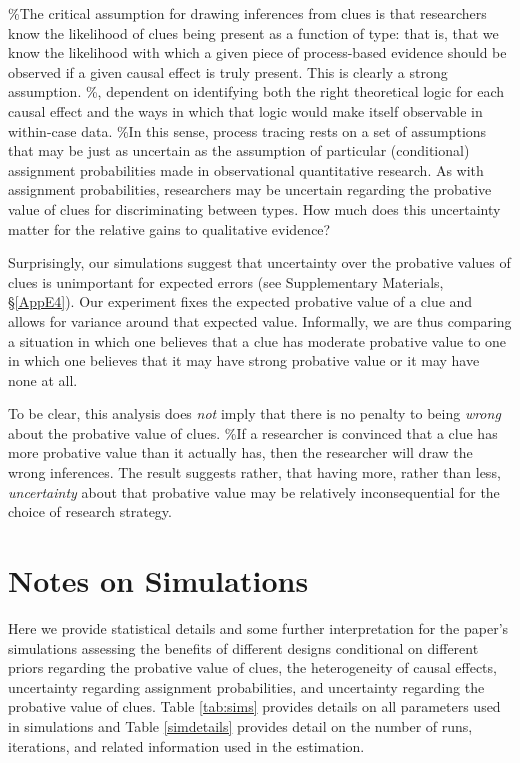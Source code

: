 \documentclass[12pt,]{book}
\begin{document}
\%The critical assumption for drawing inferences from clues is that researchers know the likelihood of clues being present as a function of type: that is, that we know the likelihood with which a given piece of process-based evidence should be observed if a given causal effect is truly present. This is clearly a strong assumption. \%, dependent on identifying both the right theoretical logic for each causal effect and the ways in which that logic would make itself observable in within-case data.
\%In this sense, process tracing rests on a set of assumptions that may be just as uncertain as the assumption of particular (conditional) assignment probabilities made in observational quantitative research.
As with assignment probabilities, researchers may be uncertain regarding the probative value of clues for discriminating between types. How much does this uncertainty matter for the relative gains to qualitative evidence?

Surprisingly, our simulations suggest that uncertainty over the probative values of clues is unimportant for expected errors (see Supplementary Materials, \S\ref{AppE4}). Our experiment fixes the expected probative value of a clue and allows for variance around that expected value. Informally, we are thus comparing a situation in which one believes that a clue has moderate probative value to one in which one believes that it may have strong probative value or it may have none at all.

To be clear, this analysis does \emph{not} imply that there is no penalty to being \emph{wrong} about the probative value of clues. \%If a researcher is convinced that a clue has more probative value than it actually has, then the researcher will draw the wrong inferences.
The result suggests rather, that having more, rather than less, \emph{uncertainty} about that probative value may be relatively inconsequential for the choice of research strategy.

\hypertarget{AppSimNotes}{%
\section{Notes on Simulations}\label{AppSimNotes}}

Here we provide statistical details and some further interpretation for the paper's simulations assessing the benefits of different designs conditional on different priors regarding the probative value of clues, the heterogeneity of causal effects, uncertainty regarding assignment probabilities, and uncertainty regarding the probative value of clues. Table \ref{tab:sims} provides details on all parameters used in simulations and Table \ref{simdetails} provides detail on the number of runs, iterations, and related information used in the estimation.
\end{document}
